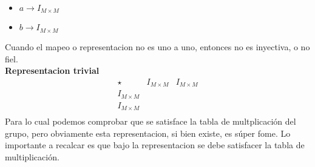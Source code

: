 \documentclass[../main.tex]{subfiles}
\begin{document}
\begin{itemize}
  \item $a\rightarrow I_{M\times M}$
  \item $b\rightarrow I_{M\times M}$
\end{itemize}
Cuando el mapeo o representacion no es uno a uno, entonces no es inyectiva, o no fiel. \\
\textbf{Representacion trivial}
\begin{equation*}
\begin{array}{c|cc}
  \star & I_{M\times M} & I_{M\times M}  \\
  \hline
  I_{M\times M} & \\
  I_{M\times M} & \\
\end{array}
\end{equation*}
Para lo cual podemos comprobar que se satisface la tabla de multplicación del grupo, pero obviamente esta representacion, si bien existe, es súper fome. Lo importante a recalcar es que bajo la representacion se debe satisfacer la tabla de multiplicación.
\end{document}
